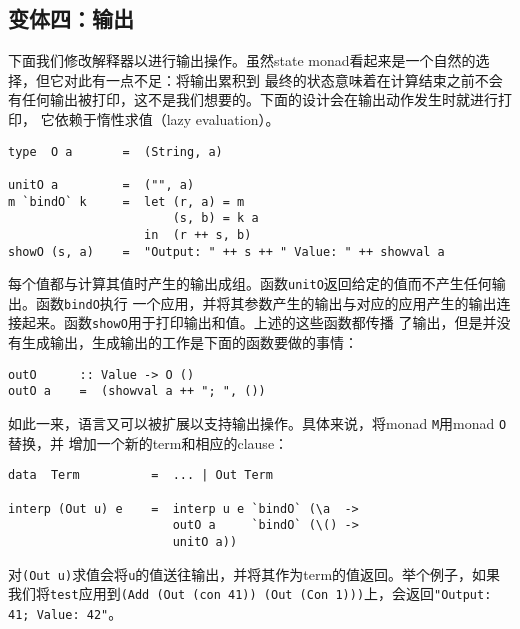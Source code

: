 \documentclass[12pt]{article}
\begin{document}
\subsection{变体四：输出}\label{sec:output}
下面我们修改解释器以进行输出操作。虽然state monad看起来是一个自然的选择，但它对此有一点不足：将输出累积到
最终的状态意味着在计算结束之前不会有任何输出被打印，这不是我们想要的。下面的设计会在输出动作发生时就进行打印，
它依赖于惰性求值（lazy evaluation）。
\begin{verbatim}
type  O a       =  (String, a)

unitO a         =  ("", a)
m `bindO` k     =  let (r, a) = m
                       (s, b) = k a
                   in  (r ++ s, b)
showO (s, a)    =  "Output: " ++ s ++ " Value: " ++ showval a
\end{verbatim}
\noindent{}每个值都与计算其值时产生的输出成组。函数\texttt{unitO}返回给定的值而不产生任何输出。函数\texttt{bindO}执行
一个应用，并将其参数产生的输出与对应的应用产生的输出连接起来。函数\texttt{showO}用于打印输出和值。上述的这些函数都传播
了输出，但是并没有生成输出，生成输出的工作是下面的函数要做的事情：
\begin{verbatim}
outO      :: Value -> O ()
outO a    =  (showval a ++ "; ", ())
\end{verbatim}

\indent{}如此一来，语言又可以被扩展以支持输出操作。具体来说，将monad \texttt{M}用monad \texttt{O}替换，并
增加一个新的term和相应的clause：
\begin{verbatim}
data  Term          =  ... | Out Term

interp (Out u) e    =  interp u e `bindO` (\a  ->
                       outO a     `bindO` (\() ->
                       unitO a))
\end{verbatim}
\noindent{}对\texttt{(Out u)}求值会将\texttt{u}的值送往输出，并将其作为term的值返回。举个例子，如果
我们将\texttt{test}应用到\texttt{(Add (Out (con 41)) (Out (Con 1)))}上，会返回\texttt{"Output: 41; Value: 42"}。
\end{document}
